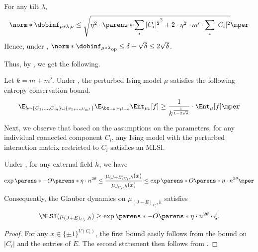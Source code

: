 \documentclass[11pt,letterpaper]{article}
\begin{document}
\begin{corollary}\label{cor:dobrushin}
    For any tilt $\lambda$,
    \[
        \norm*{\dobinf_{\mu\ast\lambda}}_F \le \sqrt{ \eta^2\cdot\parens*{\sum_i |C_i|^2}^2 + 2\cdot\eta^2 \cdot m'\cdot\sum_i |C_i|^2 }\mper
    \]
    Hence, under , $\norm*{\dobinf_{\mu\ast\lambda}}_{\mathrm{op}} \le \delta + \sqrt{\delta} \le 2\sqrt{\delta}$.
\end{corollary}

Thus, by , we get the following.

\begin{corollary}\label{cor:entropy-conservation-perturb}
    Let $k = m + m'$. Under , the perturbed Ising model $\mu$ satisfies the following entropy conservation bound.
    \[
        \E_{b\sim\{C_1,\dots,C_m\}\cup\{v_1,\dots,v_{m'}\} } \E_{\bx_{-b}\sim\mu_{-b}} \Ent_{\mu_b}[f] \ge \frac{1}{k^{\frac{1}{1-2\sqrt{\delta}}}} \cdot \Ent_{\mu}[f]\mper
    \]
\end{corollary}


Next, we observe that based on the assumptions on the parameters, for any individual connected component $C_i$, any Ising model with the perturbed interaction matrix restricted to $C_i$ satisfies an MLSI.

\begin{lemma}\label{lem:perturb-mlsi-centered}
    Under , for any external field $h$, we have 
    \[
        \exp\parens*{-O\parens*{\eta \cdot n^{2\theta}}} \le \frac{ \mu_{(J+E)_{C_i}, h}(x) }{ \mu_{J_{C_i}, h}(x) } \le \exp\parens*{O\parens*{\eta \cdot n^{2\theta}}}\mper
    \]
    Consequently, the Glauber dynamics on $\mu_{(J+E)_{C_i}, h}$ satisfies
    \[
        \MLSI(\mu_{(J+E)_{C_i}, h}) \ge \exp\parens*{-O\parens*{\eta \cdot n^{2\theta}}}\cdot\zeta.
    \]
\end{lemma}
\begin{proof}
    For any $x\in\{\pm1\}^{V(C_i)}$, the first bound easily follows from the bound on $|C_i|$ and the entries of $E$. 
    The second statement then follows from .
\end{proof}
\end{document}
